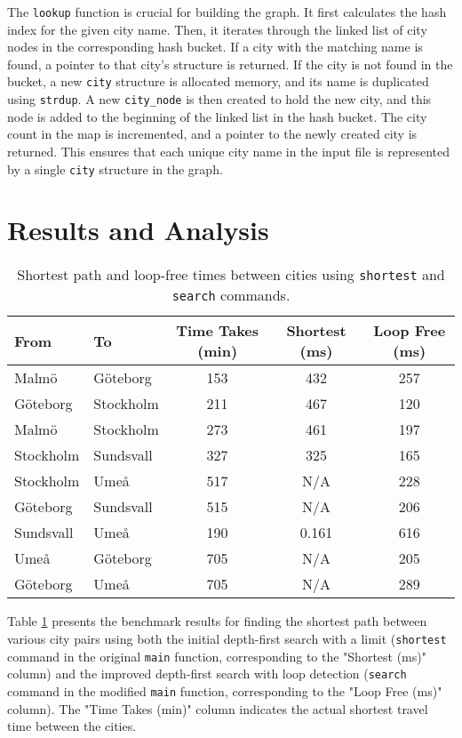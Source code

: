 \documentclass[a4paper,11pt]{article}
\begin{document}
The \texttt{lookup} function is crucial for building the graph. It first calculates the hash index for the given city name. Then, it iterates through the linked list of city nodes in the corresponding hash bucket. If a city with the matching name is found, a pointer to that city's structure is returned. If the city is not found in the bucket, a new \texttt{city} structure is allocated memory, and its name is duplicated using \texttt{strdup}. A new \texttt{city\_node} is then created to hold the new city, and this node is added to the beginning of the linked list in the hash bucket. The city count in the map is incremented, and a pointer to the newly created city is returned. This ensures that each unique city name in the input file is represented by a single \texttt{city} structure in the graph.

\section*{Results and Analysis}

\begin{table}[h]
    \centering
    \begin{tabular}{|l|l|c|c|c|}
    \hline
    \textbf{From} & \textbf{To} & \textbf{Time Takes (min)} & \textbf{Shortest (ms)} & \textbf{Loop Free (ms)} \\
    \hline
    Malmö & Göteborg & 153 & 432 & 257 \\
    Göteborg & Stockholm & 211 & 467 & 120 \\
    Malmö & Stockholm & 273 & 461 & 197 \\
    Stockholm & Sundsvall & 327 & 325 & 165 \\
    Stockholm & Umeå & 517 & N/A & 228 \\
    Göteborg & Sundsvall & 515 & N/A & 206 \\
    Sundsvall & Umeå & 190 & 0.161 & 616 \\
    Umeå & Göteborg & 705 & N/A & 205 \\
    Göteborg & Umeå & 705 & N/A & 289 \\
    \hline
    \end{tabular}
    \caption{Shortest path and loop-free times between cities using \texttt{shortest} and \texttt{search} commands.}
    \label{tab:city_paths}
\end{table}

Table \ref{tab:city_paths} presents the benchmark results for finding the shortest path between various city pairs using both the initial depth-first search with a limit (\texttt{shortest} command in the original \texttt{main} function, corresponding to the "Shortest (ms)" column) and the improved depth-first search with loop detection (\texttt{search} command in the modified \texttt{main} function, corresponding to the "Loop Free (ms)" column). The "Time Takes (min)" column indicates the actual shortest travel time between the cities.
\end{document}
